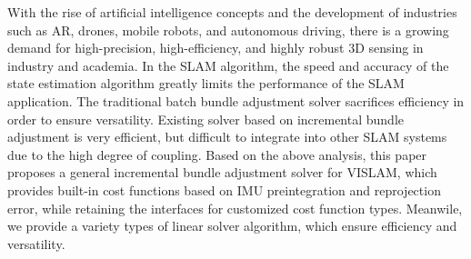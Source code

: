 \begin{englishabstract}
    With the rise of artificial intelligence concepts and the development of industries such as AR, drones, mobile robots, and autonomous driving, there is a growing demand for high-precision, high-efficiency, and highly robust 3D sensing in industry and academia. In the SLAM algorithm, the speed and accuracy of the state estimation algorithm greatly limits the performance of the SLAM application. The traditional batch bundle adjustment solver sacrifices efficiency in order to ensure versatility. Existing solver based on incremental bundle adjustment is very efficient, but difficult to integrate into other SLAM systems due to the high degree of coupling. Based on the above analysis, this paper proposes a general incremental bundle adjustment solver for VISLAM, which provides built-in cost functions based on IMU preintegration and reprojection error, while retaining the interfaces for customized cost function types. Meanwile, we provide a variety types of linear solver algorithm, which ensure efficiency and versatility.

\end{englishabstract}
